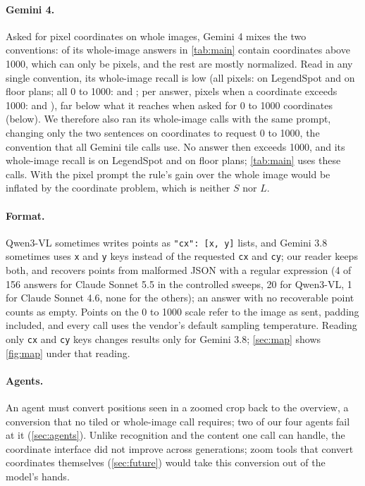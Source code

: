 \paragraph{Gemini 4.} Asked for pixel coordinates on whole images, Gemini 4 mixes the two conventions: \CgemFourOver{} of its \CgemFourAns{} whole-image answers in \cref{tab:main} contain coordinates above 1000, which can only be pixels, and the rest are mostly normalized. Read in any single convention, its whole-image recall is low (all pixels: \CgemFourLsPx{} on LegendSpot and \CgemFourFpPx{} on floor plans; all 0 to 1000: \CgemFourLsNorm{} and \CgemFourFpNorm; per answer, pixels when a coordinate exceeds 1000: \CgemFourLsMix{} and \CgemFourFpMix), far below what it reaches when asked for 0 to 1000 coordinates (below). We therefore also ran its whole-image calls with the same prompt, changing only the two sentences on coordinates to request 0 to 1000, the convention that all Gemini tile calls use. No answer then exceeds 1000, and its whole-image recall is \CtLsGemFourRecW{} on LegendSpot and \CtFpGemFourRecW{} on floor plans; \cref{tab:main} uses these calls. With the pixel prompt the rule's gain over the whole image would be inflated by the coordinate problem, which is neither $S$ nor $L$.

\paragraph{Format.} Qwen3-VL sometimes writes points as \texttt{"cx": [x, y]} lists, and Gemini 3.8 sometimes uses \texttt{x} and \texttt{y} keys instead of the requested \texttt{cx} and \texttt{cy}; our reader keeps both, and recovers points from malformed JSON with a regular expression (4 of 156 answers for Claude Sonnet 5.5 in the controlled sweeps, 20 for Qwen3-VL, 1 for Claude Sonnet 4.6, none for the others); an answer with no recoverable point counts as empty. Points on the 0 to 1000 scale refer to the image as sent, padding included, and every call uses the vendor's default sampling temperature. Reading only \texttt{cx} and \texttt{cy} keys changes results only for Gemini 3.8; \cref{sec:map} shows \cref{fig:map} under that reading.

\paragraph{Agents.} An agent must convert positions seen in a zoomed crop back to the overview, a conversion that no tiled or whole-image call requires; two of our four agents fail at it (\cref{sec:agents}). Unlike recognition and the content one call can handle, the coordinate interface did not improve across generations; zoom tools that convert coordinates themselves (\cref{sec:future}) would take this conversion out of the model's hands.
